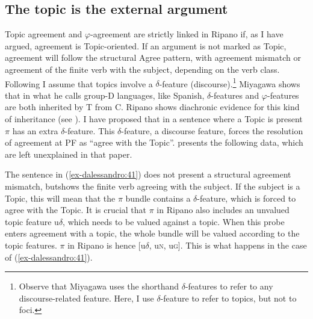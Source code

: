 \documentclass[output=paper
,modfonts
,nonflat]{langsci/langscibook}
\begin{document}
\subsection{The topic is the external argument}\label{sec-dalessandro:5.1}
Topic agreement and $\varphi $-agreement are strictly linked in Ripano if, as I have argued, agreement is Topic-oriented. If an argument is not marked as Topic, agreement will follow the structural Agree pattern, with agreement mismatch or agreement of the finite verb with the subject, depending on the verb class. Following \citet{Miyagawa2017} I assume that topics involve a $\delta $-feature (discourse).\footnote{Observe that Miyagawa uses the shorthand $\delta $-features to refer to any discourse-related feature. Here, I use $\delta $-feature to refer to topics, but not to foci.} Miyagawa shows that in what he calls group-D languages, like Spanish, $\delta $-features and $\varphi $-features are both inherited by T from C. Ripano shows diachronic evidence for this kind of inheritance (see ). 
I have proposed that in a sentence where a Topic is present $\pi $ has an extra $\delta $-feature. This $\delta $-feature, a discourse feature, forces the resolution of agreement at PF as “agree with the Topic”. \citet{D`Alessandro2017} presents the following data, which are left unexplained in that paper.

\begin{exe}
\judgewidth{*/$\#$}
 \label{ex-dalessandro:41}
\end{exe}
The sentence in (\ref{ex-dalessandro:41}) does not present a structural agreement mismatch, but\linebreak shows the finite verb agreeing with the subject. If the subject is a Topic, this will mean that the $\pi $ bundle contains a $\delta $-feature, which is forced to agree with the Topic. 
It is crucial that $\pi $ in Ripano also includes an unvalued topic feature u$\delta $, which needs to be valued against a topic. When this probe enters agreement with a topic, the whole bundle will be valued according to the topic features. $\pi $ in Ripano is hence [u$\delta $, u\textsc{n,} u\textsc{g].} This is what happens in the case of (\ref{ex-dalessandro:41}).
\end{document}
